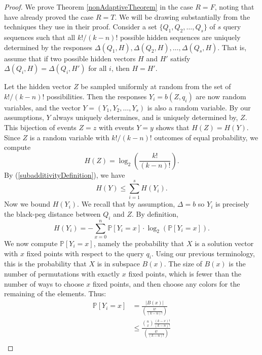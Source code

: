 \documentclass[12pt, a4paper]{article}
\begin{document}
\begin{proof}
	We prove Theorem \ref{nonAdaptiveTheorem} in the case $R = F$, noting that \cite{DS13} have already proved the case $R=T$. We will be drawing substantially from the techniques they use in their proof. Consider a set $\{Q_1, Q_2, \ldots, Q_s\}$ of $s$ query sequences such that all $k!/(k-n)!$ possible hidden sequences are uniquely determined by the responses $\Delta(Q_1, H), \Delta(Q_2, H), \ldots, \Delta(Q_s, H)$. That is, assume that if two possible hidden vectors $H$ and $H'$ satisfy $\Delta(Q_i, H) = \Delta(Q_i, H')$ for all $i$, then $H = H'$.

	Let the hidden vector $Z$ be sampled uniformly at random from the set of $k!/(k-n)!$ possibilities. Then the responses $Y_i = b(Z, q_i)$ are now random variables, and the vector $Y = (Y_1, Y_2, \ldots, Y_s)$ is also a random variable. By our assumptions, $Y$ always uniquely determines, and is uniquely determined by, $Z$. This bijection of events  $Z=z$ with events $Y=y$ shows that $H(Z) = H(Y)$. Since $Z$ is a random variable with $k!/(k-n)!$ outcomes of equal probability, we compute
	\begin{equation}\label{equalEntropy}
		H(Z) = \log_2\left(\frac{k!}{(k-n)!}\right).
	\end{equation}
	By (\ref{subadditivityDefinition}), we have
	\begin{equation}\label{entropySum}
		H(Y)\le\sum_{i=1}^s H(Y_i).
	\end{equation}
	Now we bound $H(Y_i)$. We recall that by assumption, $\Delta = b$ so $Y_i$ is precisely the black-peg distance between $Q_i$ and $Z$. By definition,
	\begin{equation}\label{entropyDef}
		H(Y_i)=-\sum_{x=0}^n \mathbb{P}[Y_i=x]\cdot\log_2(\mathbb{P}[Y_{i}=x]).
	\end{equation}
	We now compute $\mathbb{P}[Y_i=x]$, namely the probability that $X$ is a solution vector with $x$ fixed points with respect to the query $q_i$. Using our previous terminology, this is the probability that $X$ is in subspace $B(x)$.
	The size of $B(x)$ is the number of permutations with exactly $x$ fixed points, which is fewer than the number of ways to choose $x$ fixed points, and then choose any colors for the remaining of the elements. Thus:
	\begin{align*}
		\mathbb{P}[Y_i = x] &= \frac{|B(x)|}{\left(\frac{k!}{(k-n)!}\right)}\\
		&\leq \frac{\binom{n}{x}\frac{(k-x)!}{(k-n)!}}{\left(\frac{k!}{(k-n)!}\right)}\\

\end{align*}
\end{proof}
\end{document}
